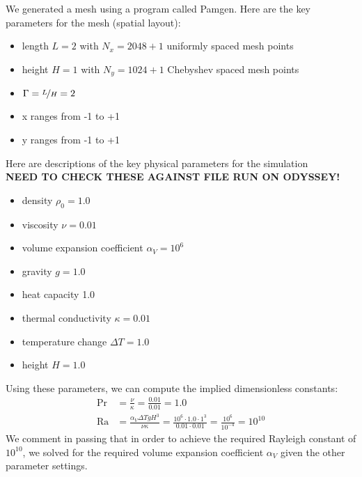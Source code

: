 \documentclass[11pt]{article} %
\begin{document}
We generated a mesh using a program called Pamgen.  Here are the key parameters for the mesh (spatial layout):
\begin{itemize}
\item{length} $L=2$  with $N_x = 2048 + 1$ uniformly spaced mesh points
\item{height} $H=1$ with $N_y = 1024 + 1$ Chebyshev spaced mesh points
\item{$\Gamma = \nicefrac{L}{H} = 2$}
\item{x} ranges from -1 to +1
\item{y} ranges from -1 to +1
\end{itemize}

Here are descriptions of the key physical parameters for the simulation
\\ \textbf{NEED TO CHECK THESE AGAINST FILE RUN ON ODYSSEY!}
\begin{itemize}
\item{density} $\rho_0 = 1.0$
\item{viscosity} $\nu = 0.01$
\item{volume expansion coefficient} $\alpha_V = 10^6$
\item{gravity} $g = 1.0$
\item{heat capacity} 1.0
\item{thermal conductivity} $\kappa = 0.01$
\item{temperature change} $\Delta T = 1.0$ 
\item{height} $H = 1.0$
\end{itemize}

Using these parameters, we can compute the implied dimensionless constants:
\begin{align}
\textrm{Pr} &= \frac{\nu}{\kappa} = \frac{0.01}{0.01} = 1.0 \\
\textrm{Ra} &= \frac{\alpha_V \Delta T g H^3}{\nu \kappa} = \frac{10^{6} \cdot 1.0 \cdot 1^3}{0.01 \cdot 0.01} = \frac{10^{6}}{10^{-4}} = 10^{10}
\end{align}
We comment in passing that in order to achieve the required Rayleigh constant of $10^{10}$, 
we solved for the required volume expansion coefficient $\alpha_V$ given the other parameter settings.
\end{document}
